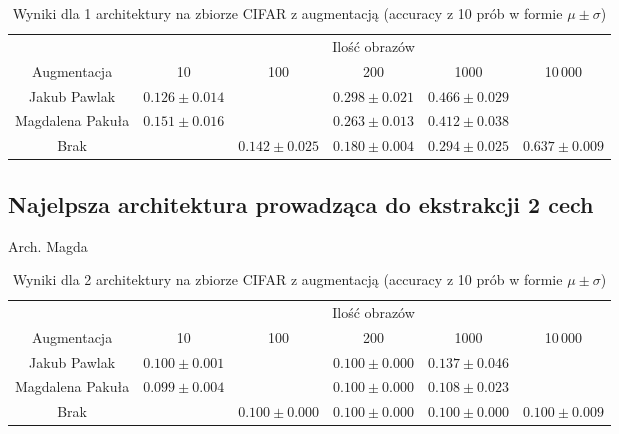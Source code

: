\documentclass[10pt]{article}
\begin{document}
\begin{table}[H]\centering
    \begin{tabular}{cccccc}
        \toprule
                         & \multicolumn{5}{c}{Ilość obrazów}                                                                                  \\ \cmidrule{2-6}
        Augmentacja      & 10                                & 100               & 200                & 1000              & 10\,000           \\ \midrule
        Jakub Pawlak     & $0.126 \pm 0.014 $                &                   & $0.298 \pm 0.021 $ & $0.466 \pm 0.029$                     \\
        Magdalena Pakuła & $0.151 \pm 0.016 $                &                   & $0.263 \pm 0.013 $ & $0.412 \pm 0.038$                     \\
        Brak             &                                   & $0.142 \pm 0.025$ & $0.180 \pm 0.004$  & $0.294 \pm 0.025$ & $0.637 \pm 0.009$ \\
        \bottomrule
    \end{tabular}
    \caption{Wyniki dla 1 architektury na zbiorze CIFAR z augmentacją (accuracy z 10 prób w formie $\mu \pm \sigma$)}\label{tab:augmented_cifar_big}
\end{table}

\subsection*{Najelpsza architektura prowadząca do ekstrakcji 2 cech}

Arch. Magda

\begin{table}[H]\centering
    \begin{tabular}{cccccc}
        \toprule
                         & \multicolumn{5}{c}{Ilość obrazów}                                                                                  \\ \cmidrule{2-6}
        Augmentacja      & 10                                & 100               & 200                & 1000              & 10\,000           \\ \midrule
        Jakub Pawlak     & $0.100 \pm 0.001 $                &                   & $0.100 \pm 0.000 $ & $0.137 \pm 0.046$                     \\
        Magdalena Pakuła & $0.099 \pm 0.004 $                &                   & $0.100 \pm 0.000 $ & $0.108 \pm 0.023$                     \\
        Brak             &                                   & $0.100 \pm 0.000$ & $0.100 \pm 0.000$  & $0.100 \pm 0.000$ & $0.100 \pm 0.009$ \\
        \bottomrule
    \end{tabular}
    \caption{Wyniki dla 2 architektury na zbiorze CIFAR z augmentacją (accuracy z 10 prób w formie $\mu \pm \sigma$)}
    \label{tab:augmented_cifar_small}
\end{table}
\end{document}
